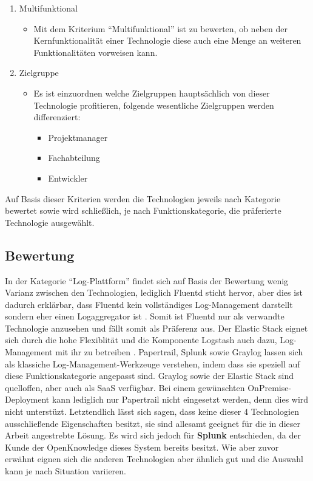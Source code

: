 \begin{enumerate}
	\item Multifunktional
	\begin{itemize}
		\item Mit dem Kriterium \enquote{Multifunktional} ist zu bewerten, ob neben der Kernfunktionalität einer Technologie diese auch eine Menge an weiteren Funktionalitäten vorweisen kann.
	\end{itemize}

	\item Zielgruppe
	\begin{itemize}
		\item Es ist einzuordnen welche Zielgruppen hauptsächlich von dieser Technologie profitieren, folgende wesentliche Zielgruppen werden differenziert:
		\begin{itemize}
			\item Projektmanager
			\item Fachabteilung
			\item Entwickler
		\end{itemize}
	\end{itemize}
\end{enumerate}

Auf Basis dieser Kriterien werden die Technologien jeweils nach Kategorie bewertet sowie wird schließlich, je nach Funktionskategorie, die präferierte Technologie ausgewählt.

\subsection{Bewertung}

In der Kategorie \enquote{Log-Plattform} findet sich auf Basis der Bewertung wenig Varianz zwischen den Technologien, lediglich Fluentd sticht hervor, aber dies ist dadurch erklärbar, dass Fluentd kein vollständiges Log-Management darstellt sondern eher einen Logaggregator ist \cite{FluentdAggregator}. Somit ist Fluentd nur als verwandte Technologie anzusehen und fällt somit als Präferenz aus. Der Elastic Stack eignet sich durch die hohe Flexiblität und die Komponente Logstash auch dazu, Log-Management mit ihr zu betreiben \cite{ThreatIdentificationFromAccessLogsUsingElasticStack}. Papertrail, Splunk sowie Graylog lassen sich als klassiche Log-Management-Werkzeuge verstehen, indem dass sie speziell auf diese Funktionskategorie angepasst sind. Graylog sowie der Elastic Stack sind quelloffen, aber auch als SaaS verfügbar. Bei einem gewünschten OnPremise-Deployment kann lediglich nur Papertrail nicht eingesetzt werden, denn dies wird nicht unterstüzt. Letztendlich lässt sich sagen, dass keine dieser 4 Technologien ausschließende Eigenschaften besitzt, sie sind allesamt geeignet für die in dieser Arbeit angestrebte Lösung. Es wird sich jedoch für \textbf{Splunk} entschieden, da der Kunde der OpenKnowledge dieses System bereits besitzt. Wie aber zuvor erwähnt eignen sich die anderen Technologien aber ähnlich gut und die Auswahl kann je nach Situation variieren.

